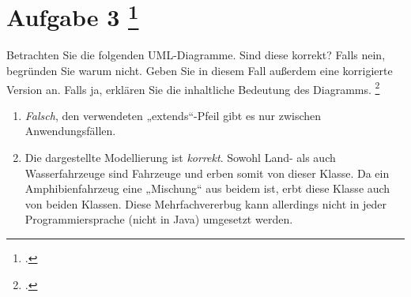 \documentclass{bschlangaul-aufgabe}
\begin{document}

\section{Aufgabe 3
\footcite[Thema 1 Teilaufgabe 1 Aufgabe 3]{examen:46116:2017:03}}

Betrachten Sie die folgenden UML-Diagramme. Sind diese korrekt? Falls
nein, begründen Sie warum nicht. Geben Sie in diesem Fall außerdem eine
korrigierte Version an. Falls ja, erklären Sie die inhaltliche Bedeutung
des Diagramms.
\footcite[Aufgabe 2]{sosy:ab:3}

\begin{enumerate}
\item \strut


\begin{liAntwort}
\emph{Falsch}, den verwendeten „extends“-Pfeil gibt es nur zwischen
Anwendungsfällen.

\end{liAntwort}

\item \strut


\begin{liAntwort}
Die dargestellte Modellierung ist \emph{korrekt}. Sowohl Land- als auch
Wasserfahrzeuge sind Fahrzeuge und erben somit von dieser Klasse. Da
ein Amphibienfahrzeug eine „Mischung“ aus beidem ist, erbt diese Klasse
auch von beiden Klassen. Diese Mehrfachvererbug kann allerdings nicht
in jeder Programmiersprache (\zB nicht in Java) umgesetzt
werden.
\end{liAntwort}


\end{enumerate}
\end{document}
